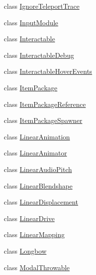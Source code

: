 \begin{DoxyCompactItemize}
\item 
class \mbox{\hyperlink{class_valve_1_1_v_r_1_1_interaction_system_1_1_ignore_teleport_trace}{Ignore\+Teleport\+Trace}}
\item 
class \mbox{\hyperlink{class_valve_1_1_v_r_1_1_interaction_system_1_1_input_module}{Input\+Module}}
\item 
class \mbox{\hyperlink{class_valve_1_1_v_r_1_1_interaction_system_1_1_interactable}{Interactable}}
\item 
class \mbox{\hyperlink{class_valve_1_1_v_r_1_1_interaction_system_1_1_interactable_debug}{Interactable\+Debug}}
\item 
class \mbox{\hyperlink{class_valve_1_1_v_r_1_1_interaction_system_1_1_interactable_hover_events}{Interactable\+Hover\+Events}}
\item 
class \mbox{\hyperlink{class_valve_1_1_v_r_1_1_interaction_system_1_1_item_package}{Item\+Package}}
\item 
class \mbox{\hyperlink{class_valve_1_1_v_r_1_1_interaction_system_1_1_item_package_reference}{Item\+Package\+Reference}}
\item 
class \mbox{\hyperlink{class_valve_1_1_v_r_1_1_interaction_system_1_1_item_package_spawner}{Item\+Package\+Spawner}}
\item 
class \mbox{\hyperlink{class_valve_1_1_v_r_1_1_interaction_system_1_1_linear_animation}{Linear\+Animation}}
\item 
class \mbox{\hyperlink{class_valve_1_1_v_r_1_1_interaction_system_1_1_linear_animator}{Linear\+Animator}}
\item 
class \mbox{\hyperlink{class_valve_1_1_v_r_1_1_interaction_system_1_1_linear_audio_pitch}{Linear\+Audio\+Pitch}}
\item 
class \mbox{\hyperlink{class_valve_1_1_v_r_1_1_interaction_system_1_1_linear_blendshape}{Linear\+Blendshape}}
\item 
class \mbox{\hyperlink{class_valve_1_1_v_r_1_1_interaction_system_1_1_linear_displacement}{Linear\+Displacement}}
\item 
class \mbox{\hyperlink{class_valve_1_1_v_r_1_1_interaction_system_1_1_linear_drive}{Linear\+Drive}}
\item 
class \mbox{\hyperlink{class_valve_1_1_v_r_1_1_interaction_system_1_1_linear_mapping}{Linear\+Mapping}}
\item 
class \mbox{\hyperlink{class_valve_1_1_v_r_1_1_interaction_system_1_1_longbow}{Longbow}}
\item 
class \mbox{\hyperlink{class_valve_1_1_v_r_1_1_interaction_system_1_1_modal_throwable}{Modal\+Throwable}}

\end{DoxyCompactItemize}
